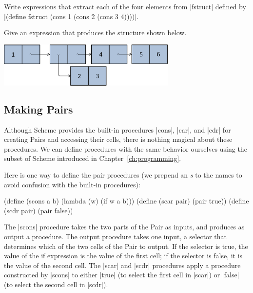\begin{schemeregion}
\beforeex
\begin{exercise}
Write expressions that extract each of the four elements from \scheme|fstruct| defined by \scheme|(define fstruct (cons 1 (cons 2 (cons 3 4))))|.
\solution{\LATER{}}
\end{exercise}
\afterex

\beforeex
\begin{exercise}
Give an expression that produces the structure shown below.
\begin{center}
\includegraphics[width=3.5in]{figures/exstruct.png} 
\end{center}
\solution{\LATER{}}
\end{exercise}
\afterex

\subsection{Making Pairs}\label{sec:makingpairs}

Although Scheme provides the built-in procedures \scheme|cons|, \scheme|car|, and \scheme|cdr| for creating Pairs and accessing their cells, there is nothing magical about these procedures.  We can define procedures with the same behavior ourselves using the subset of Scheme introduced in Chapter~\ref{ch:programming}.  

Here is one way to define the pair procedures (we prepend an \emph{s} to the names to avoid confusion with the built-in procedures):
\begin{schemedisplay}
(define (scons a b) (lambda (w) (if w a b)))
(define (scar pair) (pair true))
(define (scdr pair) (pair false))
\end{schemedisplay}
The \scheme|scons| procedure takes the two parts of the Pair as inputs, and produces as output a procedure.  The output procedure takes one input, a selector that determines which of the two cells of the Pair to output.  If the selector is true, the value of the if expression is the value of the first cell; if the selector is false, it is the value of the second cell.  The \scheme|scar| and \scheme|scdr| procedures apply a procedure constructed by \scheme|scons| to either \scheme|true| (to select the first cell in \scheme|scar|) or \scheme|false| (to select the second cell in \scheme|scdr|).


\end{schemeregion}
